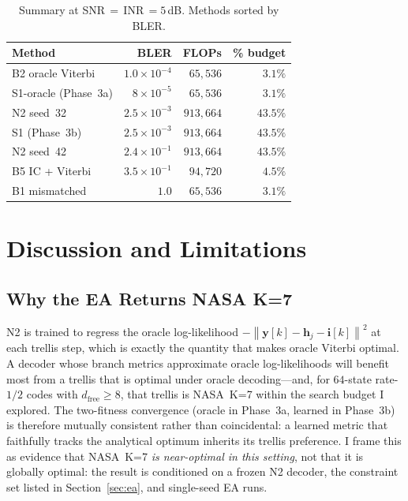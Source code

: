 \documentclass[conference]{IEEEtran}
\newcommand{\norm}[1]{\left\lVert#1\right\rVert}
\newcommand{\dfree}{d_{\mathrm{free}}}
\begin{document}
\begin{table}[t]
  \centering
  \caption{Summary at SNR\,$=$\,INR\,$=5$\,dB.  Methods sorted by BLER.}
  \label{tab:summary}
  \small
  \begin{tabular}{lrrr}
    \toprule
    Method & BLER & FLOPs & \% budget \\
    \midrule
    B2 oracle Viterbi   & $1.0\times10^{-4}$ & $65{,}536$  & $3.1\%$ \\
    S1-oracle (Phase~3a) & $8\times10^{-5}$  & $65{,}536$  & $3.1\%$ \\
    N2 seed~32          & $2.5\times10^{-3}$ & $913{,}664$ & $43.5\%$ \\
    S1 (Phase~3b)       & $2.5\times10^{-3}$ & $913{,}664$ & $43.5\%$ \\
    N2 seed~42          & $2.4\times10^{-1}$ & $913{,}664$ & $43.5\%$ \\
    B5 IC + Viterbi     & $3.5\times10^{-1}$ & $94{,}720$  & $4.5\%$ \\
    B1 mismatched       & $1.0$              & $65{,}536$  & $3.1\%$ \\
    \bottomrule
  \end{tabular}
\end{table}

\section{Discussion and Limitations}
\label{sec:discussion}

\subsection{Why the EA Returns NASA K=7}
N2 is trained to regress the oracle log-likelihood
$-\norm{\mathbf{y}[k]-\mathbf{h}_j-\mathbf{i}[k]}^2$ at each trellis step,
which is exactly the quantity that makes oracle Viterbi optimal.  A
decoder whose branch metrics approximate oracle log-likelihoods will
benefit most from a trellis that is optimal under oracle decoding---and,
for $64$-state rate-$1/2$ codes with $\dfree\geq 8$, that trellis is
NASA~K=7 within the search budget I explored.  The two-fitness
convergence (oracle in Phase~3a, learned in Phase~3b) is therefore
mutually consistent rather than coincidental: a learned metric that
faithfully tracks the analytical optimum inherits its trellis preference.
I frame this as evidence that NASA~K=7 \emph{is near-optimal in this
setting}, not that it is globally optimal: the result is conditioned on a
frozen N2 decoder, the constraint set listed in Section~\ref{sec:ea}, and
single-seed EA runs.
\end{document}
